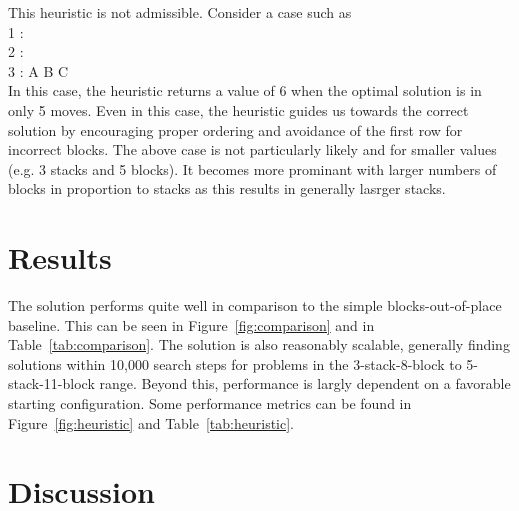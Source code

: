 \documentclass{article}
\begin{document}
This heuristic is not admissible. Consider a case such as\\
\textsc{1 :}\\
\textsc{2 :}\\
\textsc{3 : A B C}\\
In this case, the heuristic returns a value of 6 when the optimal solution is
in only 5 moves. Even in this case, the heuristic guides us towards the correct
solution by encouraging proper ordering and avoidance of the first row for
incorrect blocks. The above case is not particularly likely and for smaller
values (e.g. 3 stacks and 5 blocks). It becomes more prominant with larger
numbers of blocks in proportion to stacks as this results in generally lasrger
stacks.


\section{Results}

The solution performs quite well in comparison to the simple
blocks-out-of-place baseline. This can be seen in Figure~\ref{fig:comparison}
and in Table~\ref{tab:comparison}. The solution is also reasonably scalable,
generally finding solutions within 10,000 search steps for problems in the
3-stack-8-block to 5-stack-11-block range. Beyond this, performance is largly
dependent on a favorable starting configuration. Some performance metrics can be
found in Figure~\ref{fig:heuristic} and Table~\ref{tab:heuristic}.


\section{Discussion}
\end{document}
